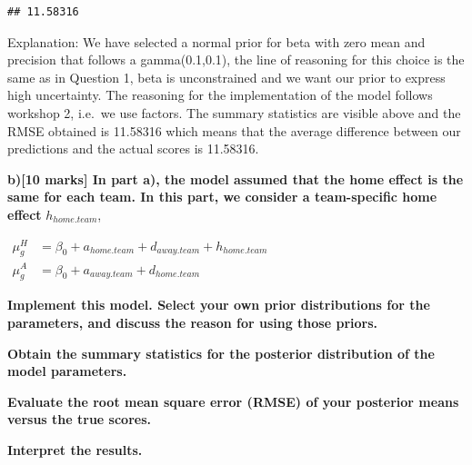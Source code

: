 \documentclass[
]{article}
\newenvironment{Shaded}{\begin{snugshade}}{\end{snugshade}}
\newcommand{\DecValTok}[1]{\textcolor[rgb]{0.00,0.00,0.81}{#1}}
\newcommand{\DocumentationTok}[1]{\textcolor[rgb]{0.56,0.35,0.01}{\textbf{\textit{#1}}}}
\newcommand{\FunctionTok}[1]{\textcolor[rgb]{0.00,0.00,0.00}{#1}}
\newcommand{\NormalTok}[1]{#1}
\newcommand{\OtherTok}[1]{\textcolor[rgb]{0.56,0.35,0.01}{#1}}
\newcommand{\SpecialCharTok}[1]{\textcolor[rgb]{0.00,0.00,0.00}{#1}}
\begin{document}
\begin{Shaded}
\end{Shaded}

\begin{verbatim}
## 11.58316
\end{verbatim}

Explanation: We have selected a normal prior for beta with zero mean and
precision that follows a gamma(0.1,0.1), the line of reasoning for this
choice is the same as in Question 1, beta is unconstrained and we want
our prior to express high uncertainty. The reasoning for the
implementation of the model follows workshop 2, i.e.~we use factors. The
summary statistics are visible above and the RMSE obtained is 11.58316
which means that the average difference between our predictions and the
actual scores is 11.58316.

\textbf{b){[}10 marks{]} In part a), the model assumed that the home
effect is the same for each team. In this part, we consider a
team-specific home effect} \(h_{home.team}\),

\(\begin{aligned} \mu_{g}^{H}&= \beta_0+a_{home.team}+d_{away.team}+h_{home.team}\\ \mu_{g}^{A}&= \beta_0+a_{away.team}+d_{home.team} \end{aligned}\)

\textbf{Implement this model. Select your own prior distributions for
the parameters, and discuss the reason for using those priors.}

\textbf{Obtain the summary statistics for the posterior distribution of
the model parameters.}

\textbf{Evaluate the root mean square error (RMSE) of your posterior
means versus the true scores.}

\textbf{Interpret the results.}
\end{document}
